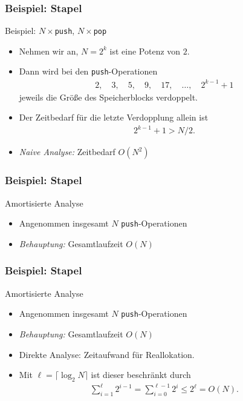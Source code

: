 \documentclass[aspectratio=1610, 11pt]{beamer}
\begin{document}
\begin{frame}\frametitle{Beispiel: Stapel}
	\begin{exampleblock}{Beispiel: $N\times${\tt push}, $N\times${\tt pop}}
		\begin{itemize}
			\item Nehmen wir an, $N=2^k$ ist eine Potenz von $2$.
			\item Dann wird bei den {\tt push}-Operationen
				\begin{align*}
					2,\quad3,\quad5,\quad9,\quad17,\quad\ldots,\quad2^{k-1}+1
				\end{align*}
				jeweils die Gr\"o\ss e des Speicherblocks verdoppelt.
			\item Der Zeitbedarf f\"ur die letzte Verdopplung allein ist
				\begin{align*}
					2^{k-1}+1>N/2.
				\end{align*}
			\item \emph{Naive Analyse:} Zeitbedarf $O(N^2)$
		\end{itemize}
	\end{exampleblock}
\end{frame}

\begin{frame}\frametitle{Beispiel: Stapel}
	\begin{exampleblock}{Amortisierte Analyse}
		\begin{itemize}
			\item Angenommen insgesamt $N$ {\tt push}-Operationen
			\item \emph{Behauptung:} Gesamtlaufzeit $O(N)$
		\end{itemize}
	\end{exampleblock}
\end{frame}

\begin{frame}\frametitle{Beispiel: Stapel}
	\begin{exampleblock}{Amortisierte Analyse}
		\begin{itemize}
			\item Angenommen insgesamt $N$ {\tt push}-Operationen
			\item \emph{Behauptung:} Gesamtlaufzeit $O(N)$
			\item \alert{Direkte Analyse:} Zeitaufwand f\"ur Reallokation.
			\item Mit $\ell=\lceil\log_2N\rceil$ ist dieser beschr\"ankt durch
				\begin{align*}
					\sum_{i=1}^{\ell}2^{i-1}=\sum_{i=0}^{\ell-1}2^i\leq2^\ell=O(N).
				\end{align*}
		\end{itemize}
	\end{exampleblock}
\end{frame}
\end{document}
